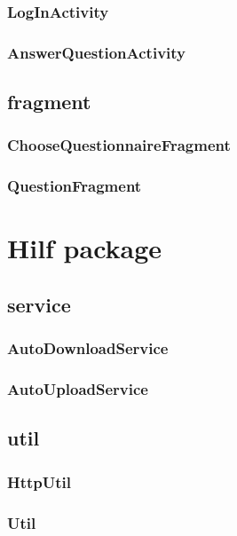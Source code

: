\documentclass[a4paper]{scrreprt}
\begin{document}
                \subsubsection{LogInActivity}
                \subsubsection{AnswerQuestionActivity}

            \subsection{fragment}

                \subsubsection{ChooseQuestionnaireFragment}
                \subsubsection{QuestionFragment}

        \section{Hilf package}

            \subsection{service}

                \subsubsection{AutoDownloadService}

                \subsubsection{AutoUploadService}

            \subsection{util}

                \subsubsection{HttpUtil}

                \subsubsection{Util}

    \glsaddall
    \printglossary

    \listoffigures
\end{document}
